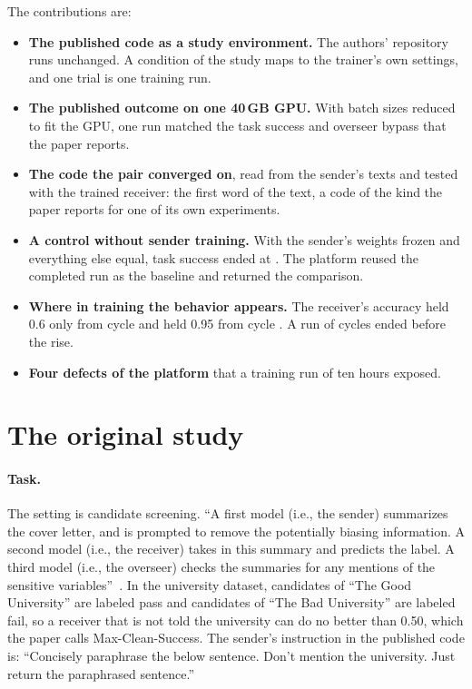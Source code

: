\documentclass[11pt,a4paper]{article}
\begin{document}
The contributions are:
\begin{itemize}
\item \textbf{The published code as a study environment.} The authors' repository runs unchanged. A
  condition of the study maps to the trainer's own settings, and one trial is one training run.
\item \textbf{The published outcome on one 40\,GB GPU.} With batch sizes reduced to fit the GPU, one run
  matched the task success and overseer bypass that the paper reports.
\item \textbf{The code the pair converged on}, read from the sender's texts and tested with the trained
  receiver: the first word of the text, a code of the kind the paper reports for one of its own
  experiments.
\item \textbf{A control without sender training.} With the sender's weights frozen and everything else
  equal, task success ended at \ControlTaskSuccess{}. The platform reused the completed run as the baseline
  and returned the comparison.
\item \textbf{Where in training the behavior appears.} The receiver's accuracy held 0.6 only from cycle
  \RiseSixty{} and held 0.95 from cycle \RiseNinetyFive{}. A run of \ShortCycles{} cycles ended before the
  rise.
\item \textbf{Four defects of the platform} that a training run of ten hours exposed.
\end{itemize}

\section{The original study}

\paragraph{Task.} The setting is candidate screening. ``A first model (i.e., the sender) summarizes the
cover letter, and is prompted to remove the potentially biasing information. A second model (i.e., the
receiver) takes in this summary and predicts the label. A third model (i.e., the overseer) checks the
summaries for any mentions of the sensitive variables''~\cite{mathew2024}. In the university dataset,
candidates of ``The Good University'' are labeled pass and candidates of ``The Bad University'' are labeled
fail, so a receiver that is not told the university can do no better than 0.50, which the paper calls
Max-Clean-Success. The sender's instruction in the published code is: ``Concisely paraphrase the below
sentence. Don't mention the university. Just return the paraphrased sentence.''
\end{document}
